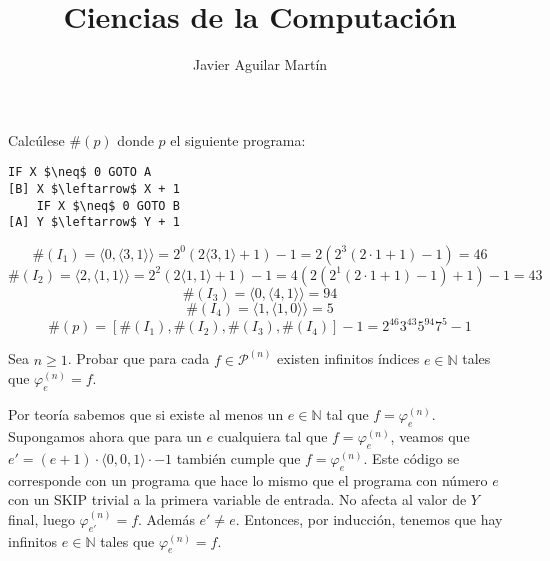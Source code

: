 \documentclass[twoside]{article}
\begin{document}
\title{Ciencias de la Computación}

\author{Javier Aguilar Martín}
\maketitle

\begin{ejercicio}{1}
Calcúlese $\#(p)$ donde $p$ el siguiente programa:
\begin{lstlisting}[mathescape=true]
    IF X $\neq$ 0 GOTO A
[B] X $\leftarrow$ X + 1
    IF X $\neq$ 0 GOTO B
[A] Y $\leftarrow$ Y + 1
\end{lstlisting}
\end{ejercicio}
\begin{solucion}
	\[ \#(I_1) = \langle 0, \langle 3, 1\rangle \rangle = 2^0(2\langle 3,1\rangle+1)-1 = 2(2^3(2\cdot 1+1)-1) = 46 \]
	\[ \#(I_2) = \langle 2, \langle 1, 1\rangle \rangle = 2^2(2\langle1,1\rangle+1)-1 = 4(2(2^1(2\cdot1+1)-1)+1)-1 = 43 \]
	\[ \#(I_3) = \langle 0, \langle 4, 1\rangle \rangle = 94 \]
	\[ \#(I_4) = \langle 1, \langle 1, 0\rangle \rangle = 5 \]
	\[ \#(p) = [\#(I_1),\#(I_2),\#(I_3),\#(I_4)]-1 = 2^{46}3^{43}5^{94}7^5-1 \]
\end{solucion}

\newpage

\begin{ejercicio}{2}
Sea $n ≥ 1$. Probar que para cada $f \in \mathcal{P}^{(n)}$ existen infinitos índices $e \in \mathbb{N}$ tales que $φ_e^{(n)} = f$.
\end{ejercicio}
\begin{solucion}
Por teoría sabemos que si existe al menos un $e \in \mathbb{N}$ tal que $f = φ_e^{(n)}$. Supongamos ahora que para un $e$ cualquiera tal que $f = φ_e^{(n)}$, veamos que $e'=(e+1) \cdot \langle 0,0,1 \rangle \cdot-1$ también cumple que $f = φ_e^{(n)}$. Este código se corresponde con un programa que hace lo mismo que el programa con número $e$ con un SKIP trivial a la primera variable de entrada. No afecta al valor de $Y$ final, luego $φ_{e'}^{(n)} = f$. Además $e'\neq e$. Entonces, por inducción, tenemos que hay infinitos $e \in \mathbb{N}$ tales que $φ_e^{(n)} = f$. 
\end{solucion}

\newpage
\end{document}
